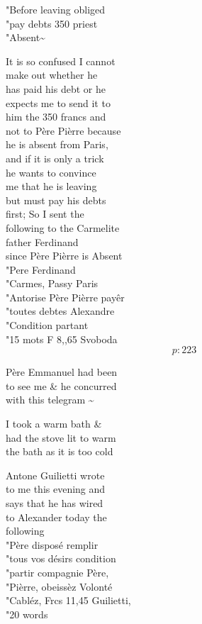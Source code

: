 \documentclass{report}
\begin{document}
	\par{
 	"Before leaving obliged\ \\"pay debts 350 priest\ \\"Absent\~{}\ \\
	}

	\par{
 	It is so confused I cannot\ \\make out whether he\ \\has paid his debt or he\ \\expects me to send it to\ \\him the 350 francs and\ \\not to Père Pièrre because\ \\he is absent from Paris,\ \\and if it is only a trick\ \\he wants to convince\ \\me that he is leaving\ \\but must pay his debts\ \\first; So I sent the\ \\following to the Carmelite\ \\father Ferdinand\ \\since Père Pièrre is Absent\ \\"Pere Ferdinand\ \\"Carmes, Passy Paris\ \\"Antorise Père Pièrre payêr\ \\"toutes debtes Alexandre\ \\"Condition partant\ \\"15 mots F 8,,65 Svoboda\ \\
  \[p: 223 \]

	}


	\par{
 	Père Emmanuel had been\ \\to see me \& he concurred\ \\with this telegram \~{}\ \\
	}

	\par{
 	I took a warm bath \&\ \\had the stove lit to warm\ \\the bath as it is too cold\ \\
	}

	\par{
 	Antone Guilietti wrote\ \\to me this evening and\ \\says that he has wired\ \\to Alexander today the\ \\following\ \\"Père disposé remplir\ \\"tous vos désirs condition\ \\"partir compagnie Père,\ \\"Pièrre, obeissèz Volonté\ \\"Cabléz, Frcs 11,45 Guilietti,\ \\"20 words\ \\
	}
\end{document}
